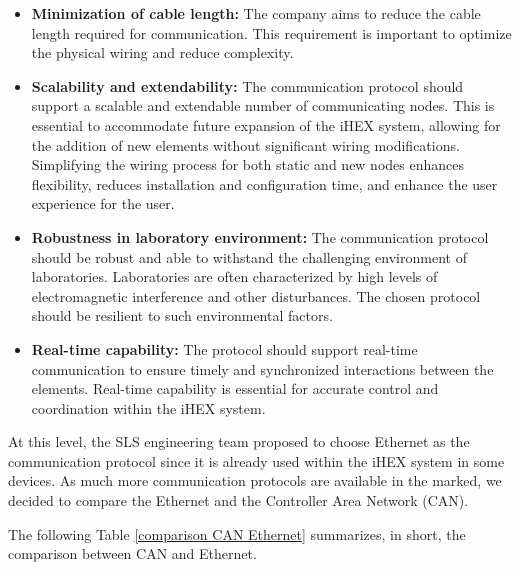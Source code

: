 \begin{itemize}
    \item \textbf{Minimization of cable length: }The company aims to reduce the cable length required for communication. This requirement is important to optimize the physical wiring and reduce complexity.
    \item \textbf{Scalability and extendability: }The communication protocol should support a scalable and extendable number of communicating nodes. This is essential to accommodate future expansion of the iHEX system, allowing for the addition of new elements without significant wiring modifications.
    Simplifying the wiring process for both static and new nodes enhances flexibility, reduces installation and configuration time, and enhance the user experience for the user.
    \item \textbf{Robustness in laboratory environment: }The communication protocol should be robust and able to withstand the challenging environment of laboratories. Laboratories are often characterized by high levels of electromagnetic interference and other disturbances. The chosen protocol should be resilient to such environmental factors.
    \item \textbf{Real-time capability: }The protocol should support real-time communication to ensure timely and synchronized interactions between the elements. Real-time capability is essential for accurate control and coordination within the iHEX system.
\end{itemize}    

At this level, the SLS engineering team proposed to choose Ethernet as the communication protocol since it is already used within the iHEX system in some devices. As much more communication protocols are available in the marked, we decided to compare the Ethernet and the Controller Area Network (CAN). 

The following Table \ref{comparison CAN Ethernet} summarizes, in short, the comparison between CAN and Ethernet.

